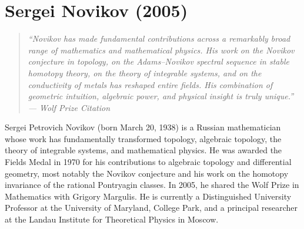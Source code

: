 \let\R\relax
\newcommand{\R}{\mathbb{R}}
\let\C\relax
\newcommand{\C}{\mathbb{C}}
\let\N\relax
\newcommand{\N}{\mathbb{N}}
\let\Z\relax
\newcommand{\Z}{\mathbb{Z}}
\let\Q\relax
\newcommand{\Q}{\mathbb{Q}}
\let\CP\relax
\newcommand{\CP}{\mathbb{CP}}
\let\RP\relax
\newcommand{\RP}{\mathbb{RP}}
\let\GL\relax
\newcommand{\GL}{\operatorname{GL}}
\let\SL\relax
\newcommand{\SL}{\operatorname{SL}}
\let\SO\relax
\newcommand{\SO}{\operatorname{SO}}
\let\U\relax
\newcommand{\U}{\operatorname{U}}
\let\Sp\relax
\newcommand{\Sp}{\operatorname{Sp}}
\let\Hom\relax
\newcommand{\Hom}{\operatorname{Hom}}
\let\Aut\relax
\newcommand{\Aut}{\operatorname{Aut}}
\let\End\relax
\newcommand{\End}{\operatorname{End}}
\let\Diff\relax
\newcommand{\Diff}{\operatorname{Diff}}
\let\Tor\relax
\newcommand{\Tor}{\operatorname{Tor}}
\let\Ext\relax
\newcommand{\Ext}{\operatorname{Ext}}
\let\Coker\relax
\newcommand{\Coker}{\operatorname{Coker}}
\let\im\relax
\newcommand{\im}{\operatorname{im}}
\let\Id\relax
\newcommand{\Id}{\operatorname{Id}}
\let\vol\relax
\newcommand{\vol}{\operatorname{vol}}
\let\Ric\relax
\newcommand{\Ric}{\operatorname{Ric}}
\let\F\relax
\newcommand{\F}{\mathbb{F}}
\let\MU\relax
\newcommand{\MU}{\operatorname{MU}}
\let\SU\relax
\newcommand{\SU}{\operatorname{SU}}

\chapter{Sergei Novikov (2005)}

\begin{quote}
\it ``Novikov has made fundamental contributions across a remarkably broad range of mathematics and mathematical physics. His work on the Novikov conjecture in topology, on the Adams--Novikov spectral sequence in stable homotopy theory, on the theory of integrable systems, and on the conductivity of metals has reshaped entire fields. His combination of geometric intuition, algebraic power, and physical insight is truly unique.'' --- Wolf Prize Citation
\end{quote}

Sergei Petrovich Novikov (born March 20, 1938) is a Russian mathematician whose work has fundamentally transformed topology, algebraic topology, the theory of integrable systems, and mathematical physics. He was awarded the Fields Medal in 1970 for his contributions to algebraic topology and differential geometry, most notably the Novikov conjecture and his work on the homotopy invariance of the rational Pontryagin classes. In 2005, he shared the Wolf Prize in Mathematics with Grigory Margulis. He is currently a Distinguished University Professor at the University of Maryland, College Park, and a principal researcher at the Landau Institute for Theoretical Physics in Moscow.

